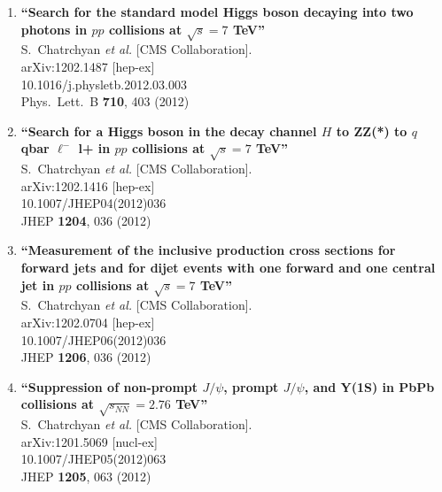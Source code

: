 \documentclass{article}
\begin{document}
\begin{enumerate}
\item%
{\bf ``Search for the standard model Higgs boson decaying into two photons in $pp$ collisions at $\sqrt{s}=7$ TeV''}
  \\{}S.~Chatrchyan {\it et al.}  [CMS Collaboration].
  \\{}arXiv:1202.1487 [hep-ex]
    \\{}10.1016/j.physletb.2012.03.003
\\{}Phys.\ Lett.\ B {\bf 710}, 403 (2012) %


\item%
{\bf ``Search for a Higgs boson in the decay channel $H$ to ZZ(*) to $q$ qbar $\ell^-$ l+ in $pp$ collisions at $\sqrt{s}=7$ TeV''}
  \\{}S.~Chatrchyan {\it et al.}  [CMS Collaboration].
  \\{}arXiv:1202.1416 [hep-ex]
    \\{}10.1007/JHEP04(2012)036
\\{}JHEP {\bf 1204}, 036 (2012) %


\item%
{\bf ``Measurement of the inclusive production cross sections for forward jets and for dijet events with one forward and one central jet in $pp$ collisions at $\sqrt{s}=7$ TeV''}
  \\{}S.~Chatrchyan {\it et al.}  [CMS Collaboration].
  \\{}arXiv:1202.0704 [hep-ex]
    \\{}10.1007/JHEP06(2012)036
\\{}JHEP {\bf 1206}, 036 (2012) %


\item%
{\bf ``Suppression of non-prompt $J/\psi$, prompt $J/\psi$, and Y(1S) in PbPb collisions at $\sqrt{s_{NN}}=2.76$ TeV''}
  \\{}S.~Chatrchyan {\it et al.}  [CMS Collaboration].
  \\{}arXiv:1201.5069 [nucl-ex]
    \\{}10.1007/JHEP05(2012)063
\\{}JHEP {\bf 1205}, 063 (2012) %



\end{enumerate}
\end{document}
